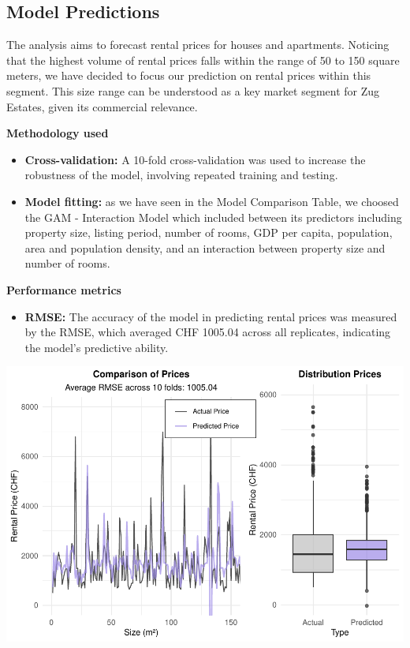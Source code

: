 \documentclass[
]{article}
\providecommand{\tightlist}{%
  \setlength{\itemsep}{0pt}\setlength{\parskip}{0pt}}
\begin{document}
\subsection{Model Predictions}\label{model-predictions}

The analysis aims to forecast rental prices for houses and apartments.
Noticing that the highest volume of rental prices falls within the range
of 50 to 150 square meters, we have decided to focus our prediction on
rental prices within this segment. This size range can be understood as
a key market segment for Zug Estates, given its commercial relevance.

\textbf{Methodology used}

\begin{itemize}
\item
  \textbf{Cross-validation:} A 10-fold cross-validation was used to
  increase the robustness of the model, involving repeated training and
  testing.
\item
  \textbf{Model fitting:} as we have seen in the Model Comparison Table,
  we choosed the GAM - Interaction Model which included between its
  predictors including property size, listing period, number of rooms,
  GDP per capita, population, area and population density, and an
  interaction between property size and number of rooms.
\end{itemize}

\textbf{Performance metrics}

\begin{itemize}
\tightlist
\item
  \textbf{RMSE:} The accuracy of the model in predicting rental prices
  was measured by the RMSE, which averaged CHF 1005.04 across all
  replicates, indicating the model's predictive ability.
\end{itemize}

\includegraphics{2024_groupXX_report_files/figure-latex/GAM Plot-1.pdf}
\end{document}
